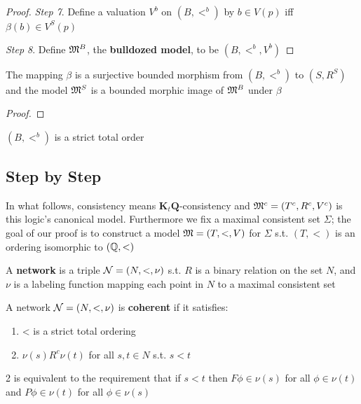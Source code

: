 \documentclass[11pt]{article}
\newcommand{\KtQ}{\textbf{K}_t\textbf{Q}}
\begin{document}
\begin{proof}
\emph{Step 7}. Define a valuation \(V^b\) on \((B,<^b)\) by \(b\in V(p)\) iff
\(\beta(b)\in V^S(p)\)

\emph{Step 8}. Define \(\mathfrak{M}^B\), the \textbf{bulldozed model}, to be \((B,<^b,V^b)\)
\end{proof}

\begin{claim}
The mapping \(\beta\) is a surjective bounded morphism from \((B,<^b)\) to
\((S,R^S)\) and the model \(\mathfrak{M}^S\) is a bounded morphic image of \(\mathfrak{M}^B\)
under \(\beta\)
\end{claim}

\begin{proof}
   
\end{proof}

\begin{claim}
\((B,<^b)\) is a strict total order
\end{claim}
\subsection{Step by Step}
\label{sec:orgffed6f3}
In what follows, consistency means \(\KtQ\)-consistency and
\(\mathfrak{M}^c=(T^c,R^c,V^c)\) is this logic's canonical model. Furthermore we fix a
maximal consistent set \(\Sigma\); the goal of our proof is  to construct a model
\(\mathfrak{M}=(T,<,V)\) for \(\Sigma\) s.t. \((T,<)\) is an ordering isomorphic to \((\mathbb{Q},<)\)

\begin{definition}[]
A \textbf{network} is a triple \(\mathcal{N}=(N,<,\nu)\) s.t. \(R\) is a binary relation on
the set \(N\), and \(\nu\) is a labeling function mapping each point in \(N\) to a
maximal consistent set
\end{definition}

\begin{definition}[]
A network \(\mathcal{N}=(N,<,\nu)\) is \textbf{coherent} if it satisfies:
\begin{enumerate}
\item < is a strict total ordering
\item \(\nu(s)R^c\nu(t)\) for all \(s,t\in N\) s.t. \(s<t\)
\end{enumerate}
\end{definition}

2 is equivalent to the requirement that if \(s<t\) then \(F\phi\in\nu(s)\)
for all \(\phi\in\nu(t)\) and \(P\phi\in\nu(t)\) for all \(\phi\in\nu(s)\)
\end{document}
